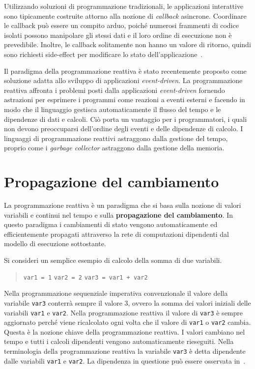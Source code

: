 \documentclass[12pt,a4paper,openright,twoside]{book}
\begin{document}
Utilizzando soluzioni di programmazione tradizionali, le applicazioni interattive sono tipicamente costruite attorno alla nozione di \textit{callback} asincrone. 
Coordinare le callback può essere un compito arduo, poiché numerosi frammenti di codice isolati possono manipolare gli stessi dati e il loro ordine di esecuzione non è prevedibile. Inoltre, le callback solitamente non hanno un valore di ritorno, quindi sono richiesti side-effect per modificare lo stato dell'applicazione~\cite{DBLP:phd/us/Cooper08}. 

Il paradigma della programmazione reattiva è stato recentemente proposto come soluzione adatta allo sviluppo di applicazioni \textit{event-driven}. La programmazione reattiva affronta i problemi posti dalla applicazioni \textit{event-driven} fornendo astrazioni per esprimere i programmi come reazioni a eventi esterni e facendo in modo che il linguaggio gestisca automaticamente il flusso del tempo e le dipendenze di dati e calcoli. Ciò porta un vantaggio per i programmatori, i quali non devono preoccuparsi dell'ordine degli eventi e delle dipendenze di calcolo. I linguaggi di programmazione reattivi astraggono dalla gestione del tempo, proprio come i \textit{garbage collector} astraggono dalla gestione della memoria. 

\section{Propagazione del cambiamento}
La programmazione reattiva è un paradigma che si basa sulla nozione di valori variabili e continui nel tempo e sulla \textbf{propagazione del cambiamento}. 
In questo paradigma i cambiamenti di stato vengono automaticamente ed efficientemente propagati attraverso la rete di computazioni dipendenti dal modello di esecuzione sottostante.

Si consideri un semplice esempio di calcolo della somma di due variabili.
\begin{quotation}\noindent
    \texttt{var1 = 1} \newline
    \texttt{var2 = 2} \newline
    \texttt{var3 = var1 + var2}
\end{quotation}
Nella programmazione sequenziale imperativa convenzionale il valore della variabile \texttt{var3} conterrà sempre il valore 3, ovvero la somma dei valori iniziali delle variabili \texttt{var1} e \texttt{var2}.
Nella programmazione reattiva il valore di \texttt{var3} è sempre aggiornato perché viene ricalcolato ogni volta che il valore di \texttt{var1} o \texttt{var2} cambia.
Questa è la nozione chiave della programmazione reattiva. I valori cambiano nel tempo e tutti i calcoli dipendenti vengono automaticamente rieseguiti. Nella terminologia della programmazione reattiva la variabile \texttt{var3} è detta dipendente dalle variabili \texttt{var1} e \texttt{var2}. La dipendenza in questione può essere osservata in~.
\end{document}
